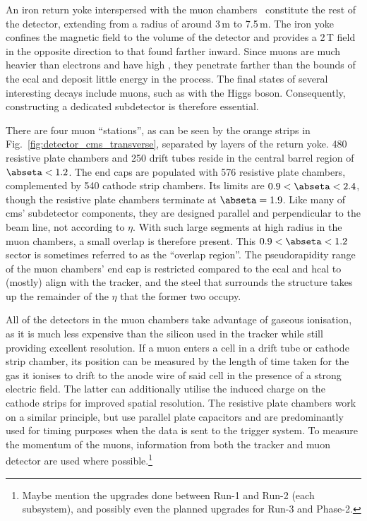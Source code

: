 An iron return yoke interspersed with the muon chambers~\cite{Layter:343814} constitute the rest of the detector, extending from a radius of around 3\,m to 7.5\,m. The iron yoke confines the magnetic field to the volume of the detector and provides a 2\,T field in the opposite direction to that found farther inward. Since muons are much heavier than electrons and have high \pt, they penetrate farther than the bounds of the \acrshort{ecal} and deposit little energy in the process. The final states of several interesting decays include muons, such as with the Higgs boson. Consequently, constructing a dedicated subdetector is therefore essential.

There are four muon ``stations'', as can be seen by the orange strips in Fig.~\ref{fig:detector_cms_transverse}, separated by layers of the return yoke. 480 resistive plate chambers and 250 drift tubes reside in the central barrel region of $\abseta < \text{1.2}$. The end caps are populated with 576 resistive plate chambers, complemented by 540 cathode strip chambers. Its limits are $\text{0.9} < \abseta < \text{2.4}$, though the resistive plate chambers terminate at $\abseta = \text{1.9}$. Like many of \acrshort{cms}' subdetector components, they are designed parallel and perpendicular to the beam line, not according to $\eta$. With such large segments at high radius in the muon chambers, a small overlap is therefore present. This $\text{0.9} < \abseta < \text{1.2}$ sector is sometimes referred to as the ``overlap region''. The pseudorapidity range of the muon chambers' end cap is restricted compared to the \acrshort{ecal} and \acrshort{hcal} to (mostly) align with the tracker, and the steel that surrounds the structure takes up the remainder of the $\eta$ that the former two occupy.

All of the detectors in the muon chambers take advantage of gaseous ionisation, as it is much less expensive than the silicon used in the tracker while still providing excellent resolution. If a muon enters a cell in a drift tube or cathode strip chamber, its position can be measured by the length of time taken for the gas it ionises to drift to the anode wire of said cell in the presence of a strong electric field. The latter can additionally utilise the induced charge on the cathode strips for improved spatial resolution. The resistive plate chambers work on a similar principle, but use parallel plate capacitors and are predominantly used for timing purposes when the data is sent to the trigger system. To measure the momentum of the muons, information from both the tracker and muon detector are used where possible.\footnote{Maybe mention the upgrades done between Run-1 and Run-2 (each subsystem), and possibly even the planned upgrades for Run-3 and Phase-2.}

